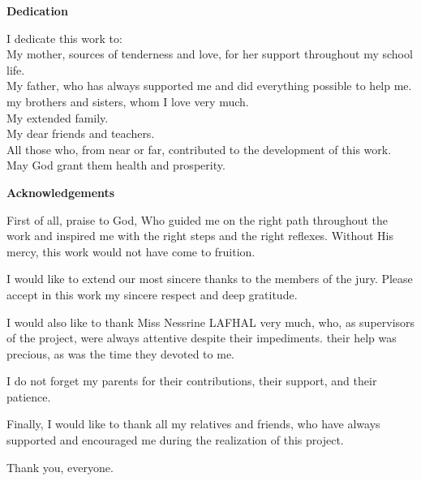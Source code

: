 \documentclass[a4paper,12pt]{report}
\begin{document}
\begin{doublespace}
\newpage
{}
{}

\vspace*{1cm}
\begin{center}
    \textbf{\huge{Dedication}}
\end{center}
\vspace{1cm}

\large{
I dedicate this work to:\\
My mother, sources of tenderness and love, for her support throughout my school life.\\
My father, who has always supported me and did everything possible to help me.\\
my brothers and sisters, whom I love very much.\\
My extended family.\\
My dear friends and teachers.\\
All those who, from near or far, contributed to the development of this work.\\
May God grant them health and prosperity.}
\newpage
{}
{}

\vspace*{1cm}
\begin{center}
    \textbf{\huge{Acknowledgements}}
\end{center}

\vspace{1cm}
\large{
First of all, praise to God, Who guided me on the right path throughout the work and inspired me with the right steps and the right reflexes. Without His mercy, this work would not have come to fruition. 

I would like to extend our most sincere thanks to the members of the jury. Please accept in this work my sincere respect and deep gratitude. 

I would also like to thank Miss Nessrine LAFHAL very much, who, as supervisors of the project, were always attentive despite their impediments. their help was precious, as was the time they devoted to me. 

I do not forget my parents for their contributions, their support, and their patience. 

Finally, I would like to thank all my relatives and friends, who have always supported and encouraged me during the realization of this project. 

Thank you, everyone.
}

\end{doublespace}
\newpage
{}
{}
\end{document}
